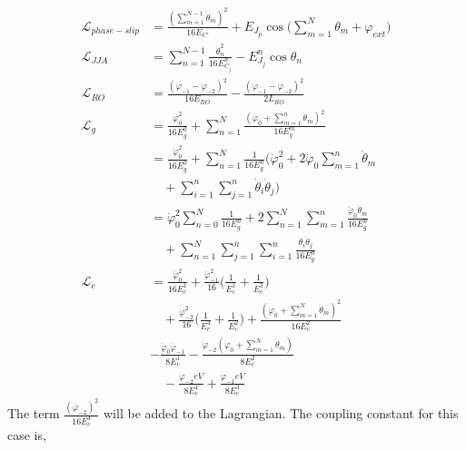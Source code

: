\documentclass[%
reprint,
superscriptaddress,
 amsmath,amssymb,
 aps,
 prx,
longbibliography,
floatfix,
]{revtex4-2}
\begin{document}
  \begin{align}
    \mathcal{L}_{phase-slip}&=\frac{(\sum_{m=1}^{N-1}\dot\theta_m)^2}{16E_{C'}}+E_{J_p}\cos\big(\sum_{m=1}^N\theta_m+\varphi_{ext}\big)\\
    \mathcal{L}_{JJA}&=\sum_{n=1}^{N-1}\frac{\dot{\theta}_n^2}{16E^{n}_{C_j}}-E^{n}_{J_j}\cos{\theta_n}\\
    \mathcal{L}_{RO}&=\frac{(\dot{\varphi}_{-1}-\dot{\varphi}_{-2})^2}{16E_{{RO}}}-\frac{(\varphi_{-1}-\varphi_{-2})^2}{2L_{RO}}\\
    \mathcal{L}_{g}&=\frac{\dot{\varphi}_0^2}{16E^0_{g}}+\sum_{n=1}^N \frac{(\dot{\varphi_0}+\sum_{m=1}^n\dot{\theta}_m)^2}{16E^m_{g}}\\
    &=\frac{\dot{\varphi}_0^2}{16E^0_{g}}+\sum_{n=1}^N \frac{1}{16E^n_{g}}(\dot{\varphi}_0^2+2\dot{\varphi}_0\sum_{m=1}^n\dot{\theta}_m\nonumber\\&\quad+\sum_{i=1}^n\sum_{j=1}^{n}\dot{\theta}_i\dot{\theta}_j)\\
    &=\dot{\varphi}_0^2\sum_{n=0}^N\frac{1}{16E^n_g}+2\sum_{n=1}^N\sum_{m=1}^n\frac{\dot{\varphi}_0\dot{\theta}_m}{16E^n_{g}}\nonumber\\&\quad+\sum_{n=1}^N\sum_{j=1}^n\sum_{i=1}^{n}\frac{\dot{\theta}_i\dot{\theta}_j}{16E^n_{g}}\\
    \mathcal{L}_{c}&=\frac{\dot{\varphi}^2_0}{16E^1_c}+\frac{\dot{\varphi}^2_{-1}}{16}\Big(\frac{1}{E^1_c}+\frac{1}{E^3_c}\Big)\nonumber\\
    &\quad+\frac{\dot{\varphi}^2_{-2}}{16}\Big(\frac{1}{E^4_c}+\frac{1}{E^2_c}\Big)+\frac{(\dot{\varphi}_0+\sum_{m=1}^N\dot{\theta}_m)^2}{16E^2_c}\nonumber\\
  &-\frac{\dot{\varphi}_0\dot{\varphi}_{-1}}{8E^1_c}-\frac{\dot{\varphi}_{-2}(\dot{\varphi}_{0}+\sum_{m=1}^N\dot{\theta}_m)}{8E^2_c}\nonumber\\
    &\quad-\frac{\dot{\varphi}_{-2}eV}{8E^4_c}+\frac{\dot{\varphi}_{-1}eV}{8E^3_c}
\end{align}
The term $\frac{(\dot{\varphi}_{-2})^2}{16E^4_{c}}$ will be added to the Lagrangian. The coupling constant for this case is,
\end{document}
